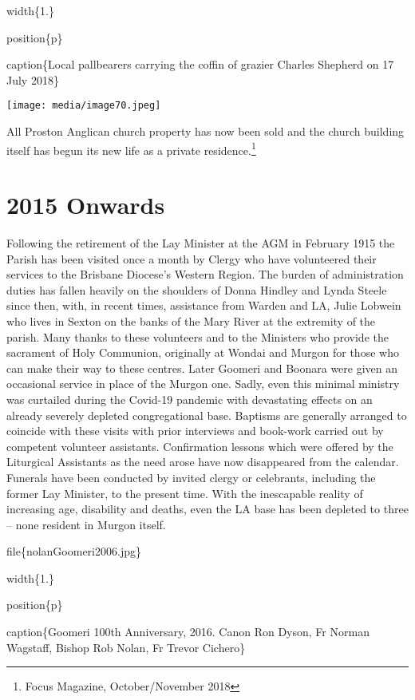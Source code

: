 width\{1.\}

position\{p\}

caption\{Local pallbearers carrying the coffin of grazier Charles Shepherd on 17 July 2018\}

\texttt{[image: media/image70.jpeg]}

All Proston Anglican church property has now been sold and the church building itself has begun its new life as a private residence.\footnote{Focus Magazine, October/November 2018}

\hypertarget{onwards}{%
\section{2015 Onwards}\label{onwards}}

Following the retirement of the Lay Minister at the AGM in February 1915 the Parish has been visited once a month by Clergy who have volunteered their services to the Brisbane Diocese's Western Region. The burden of administration duties has fallen heavily on the shoulders of Donna Hindley and Lynda Steele since then, with, in recent times, assistance from Warden and LA, Julie Lobwein who lives in Sexton on the banks of the Mary River at the extremity of the parish. Many thanks to these volunteers and to the Ministers who provide the sacrament of Holy Communion, originally at Wondai and Murgon for those who can make their way to these centres. Later Goomeri and Boonara were given an occasional service in place of the Murgon one. Sadly, even this minimal ministry was curtailed during the Covid-19 pandemic with devastating effects on an already severely depleted congregational base. Baptisms are generally arranged to coincide with these visits with prior interviews and book-work carried out by competent volunteer assistants. Confirmation lessons which were offered by the Liturgical Assistants as the need arose have now disappeared from the calendar. Funerals have been conducted by invited clergy or celebrants, including the former Lay Minister, to the present time. With the inescapable reality of increasing age, disability and deaths, even the LA base has been depleted to three -- none resident in Murgon itself.

file\{nolanGoomeri2006.jpg\}

width\{1.\}

position\{p\}

caption\{Goomeri 100th Anniversary, 2016. Canon Ron Dyson, Fr Norman Wagstaff, Bishop Rob Nolan, Fr Trevor Cichero\}

